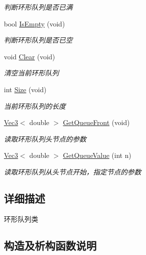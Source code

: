 \begin{DoxyCompactItemize}
\begin{DoxyCompactList}\small\item\em 判断环形队列是否已满 \end{DoxyCompactList}\item 
bool \hyperlink{classquadruped_1_1Queue_a75f7837ac00080f790075a42491d22b8}{Is\+Empty} (void)
\begin{DoxyCompactList}\small\item\em 判断环形队列是否已空 \end{DoxyCompactList}\item 
\mbox{\label{classquadruped_1_1Queue_a68e7efa200a639d16a7fd94b02c6e287}} 
void \hyperlink{classquadruped_1_1Queue_a68e7efa200a639d16a7fd94b02c6e287}{Clear} (void)
\begin{DoxyCompactList}\small\item\em 清空当前环形队列 \end{DoxyCompactList}\item 
int \hyperlink{classquadruped_1_1Queue_a85ba36eb05d9fc729e1949b1f3702e12}{Size} (void)
\begin{DoxyCompactList}\small\item\em 当前环形队列的长度 \end{DoxyCompactList}\item 
\hyperlink{cppTypes_8h_a65c27bf97693676535dd0b30ea0ad399}{Vec3}$<$ double $>$ \hyperlink{classquadruped_1_1Queue_a27bcc9cd76bf26fdd90946a95a7a62c9}{Get\+Queue\+Front} (void)
\begin{DoxyCompactList}\small\item\em 读取环形队列头节点的参数 \end{DoxyCompactList}\item 
\hyperlink{cppTypes_8h_a65c27bf97693676535dd0b30ea0ad399}{Vec3}$<$ double $>$ \hyperlink{classquadruped_1_1Queue_a08fe0a35aeb035bf663e89fbbd87038b}{Get\+Queue\+Value} (int n)
\begin{DoxyCompactList}\small\item\em 读取环形队列从头节点开始，指定节点的参数 \end{DoxyCompactList}\end{DoxyCompactItemize}


\subsection{详细描述}
环形队列类 

\subsection{构造及析构函数说明}
\mbox{\label{classquadruped_1_1Queue_a3c4948bf66b448ed65930ff9a853fbcb}} 
